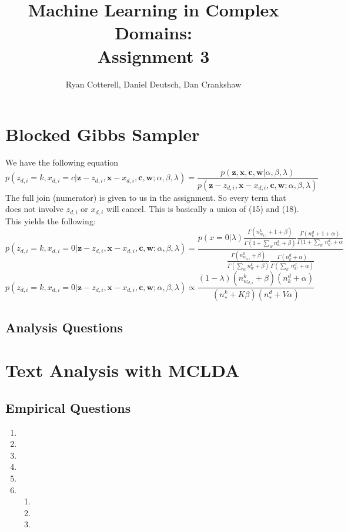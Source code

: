 \documentclass[11pt,a4paper]{article}
\title{Machine Learning in Complex Domains:\\Assignment 3}
\author{Ryan Cotterell, Daniel Deutsch, Dan Crankshaw}
\date{}
\begin{document}
\maketitle

\setcounter{section}{3}
\section{Blocked Gibbs Sampler}

We have the following equation
$$
p(z_{d,i} = k,x_{d,i} = c| \mathbf{z} - z_{d,i},\mathbf{x} - x_{d,i}, \mathbf{c},\mathbf{w} ; \alpha,\beta,\lambda) = \frac{p(\mathbf{z},\mathbf{x},\mathbf{c},\mathbf{w}|\alpha,\beta,\lambda)}{p(\mathbf{z} - z_{d,i},\mathbf{x} - x_{d,i},\mathbf{c},\mathbf{w} ; \alpha,\beta,\lambda)}
$$
The full join (numerator) is given to us in the assignment. So every term that does not involve $z_{d,i}$ or $x_{d,i}$ will cancel. This is basically a union of (15) and (18). This yields the following:
$$
p(z_{d,i} = k, x_{d,i} = 0| \mathbf{z} - z_{d,i},\mathbf{x} - x_{d,i}, \mathbf{c},\mathbf{w} ; \alpha,\beta,\lambda) = \frac{p(x=0|\lambda)
    \frac{\Gamma(n^k_{w_{d,i}} + 1 + \beta)}{\Gamma(1 + \sum_w n_w^k + \beta )} 
    \frac{\Gamma(n_k^d + 1 + \alpha)}{\Gamma(1 + \sum_{k'} n_{k'}^d + \alpha}
}
{
    \frac{\Gamma(n_{w_{d,i}}^k + \beta)}{\Gamma(\sum_w n_w^k + \beta )}
    \frac{\Gamma(n_k^d + \alpha)}{\Gamma(\sum_{k'} n_{k'}^d + \alpha) } 
}
$$
$$
p(z_{d,i} = k, x_{d,i} = 0| \mathbf{z} - z_{d,i},\mathbf{x} - x_{d,i}, \mathbf{c},\mathbf{w} ; \alpha,\beta,\lambda) \propto \frac{(1-\lambda) (n_{w_{d,i}}^k + \beta) (n_k^d + \alpha)}{(n_*^k + K\beta)(n_*^d + V\alpha)}
$$





\subsection{Analysis Questions}

\section{Text Analysis with MCLDA}
\subsection{Empirical Questions}
\begin{enumerate}
    \item 
    \item 
    \item
    \item
    \item
    \item
        \begin{enumerate}
            \item 
            \item 
            \item 
        \end{enumerate}
\end{enumerate}
\end{document}
